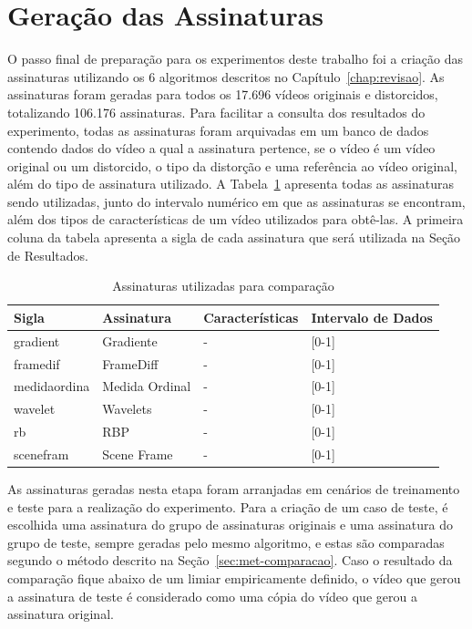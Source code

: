 \section{Geração das Assinaturas}
\label{sec:met-assinaturas}

O passo final de preparação para os experimentos deste trabalho foi a criação das assinaturas utilizando os 6 algoritmos descritos no Capítulo~\ref{chap:revisao}. As assinaturas foram geradas para todos os 17.696 vídeos originais e distorcidos, totalizando 106.176 assinaturas. Para facilitar a consulta dos resultados do experimento, todas as assinaturas foram arquivadas em um banco de dados contendo dados do vídeo a qual a assinatura pertence, se o vídeo é um vídeo original ou um distorcido, o tipo da distorção e uma referência ao vídeo original, além do tipo de assinatura utilizado. A Tabela~\ref{tab:assinaturas} apresenta todas as assinaturas sendo utilizadas, junto do intervalo numérico em que as assinaturas se encontram, além dos tipos de características de um vídeo utilizados para obtê-las. A primeira coluna da tabela apresenta a sigla de cada assinatura que será utilizada na Seção de Resultados.

\begin{table}[h]
    \centering
    \caption{Assinaturas utilizadas para comparação}
    \label{tab:assinaturas}
    \begin{tabular}{|p{}|p{}|p{}|p{}|} \hline
        \textbf{Sigla} & \textbf{Assinatura} & \textbf{Características} & \textbf{Intervalo de Dados} \\ \hline
        gradient & Gradiente & - & [0-1] \\ \hline
        framedif & FrameDiff & - & [0-1] \\ \hline
        medidaordina & Medida Ordinal & - & [0-1] \\ \hline
        wavelet & Wavelets & - & [0-1] \\ \hline
        rb & RBP & - & [0-1] \\ \hline
        scenefram & Scene Frame & - & [0-1] \\ \hline
    \end{tabular}
\end{table}

As assinaturas geradas nesta etapa foram arranjadas em cenários de treinamento e teste para a realização do experimento. Para a criação de um caso de teste, é escolhida uma assinatura do grupo de assinaturas originais e uma assinatura do grupo de teste, sempre geradas pelo mesmo algoritmo, e estas são comparadas segundo o método descrito na Seção~\ref{sec:met-comparacao}. Caso o resultado da comparação fique abaixo de um limiar empiricamente definido, o vídeo que gerou a assinatura de teste é considerado como uma cópia do vídeo que gerou a assinatura original.

